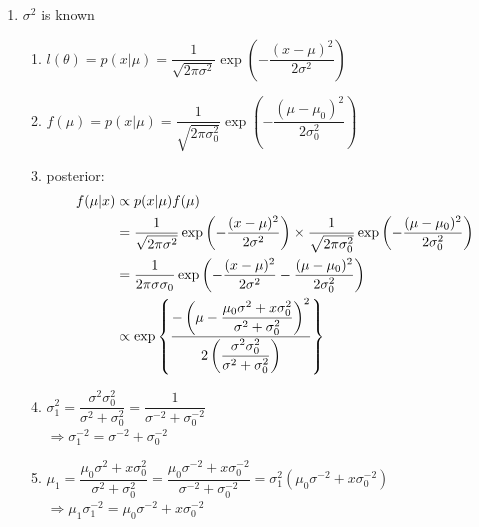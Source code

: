 \begin{enumerate}[itemsep=0.2cm]
    \item $\sigma^2$ is known
    \begin{enumerate}[itemsep=0.2cm]
        \item $
            l(\theta) 
            = p(x|\mu)
            =\dfrac{1}{\sqrt{2\pi \sigma^2}}
            \exp\left(
                -\dfrac{(x-\mu)^2}{2\sigma^2}
            \right)
        $

        \item $
            f(\mu) 
            = p(x|\mu)
            =\dfrac{1}{\sqrt{2\pi \sigma^2_0}}
            \exp\left(
                -\dfrac{(\mu-\mu_0)^2}{2\sigma_0^2}
            \right)
        $

        \item posterior:
        \begin{align*}
            f(\mu|x)
            &\propto p(x|\mu)f(\mu) \\
            &=\dfrac{1}{\sqrt{2\pi \sigma^2}}
            \exp\left(
                -\dfrac{(x-\mu)^2}{2\sigma^2}
            \right) 
            \times 
            \dfrac{1}{\sqrt{2\pi \sigma^2_0}}
            \exp\left(
                -\dfrac{(\mu-\mu_0)^2}{2\sigma_0^2}
            \right) \\
            &=\dfrac{1}{2\pi \sigma\sigma_0}
            \exp\left(
                -\dfrac{(x-\mu)^2}{2\sigma^2}
                -\dfrac{(\mu-\mu_0)^2}{2\sigma_0^2}
            \right) \\
            &\propto
            \exp\left\{
                \dfrac{
                    -\left(\mu - \dfrac{\mu_0\sigma^2 + x\sigma_0^2}{\sigma^2 + \sigma^2_0}\right)^2
                }{
                    2\left( \dfrac{\sigma^2\sigma^2_0}{\sigma^2+\sigma^2_0} \right)
                }
            \right\}
        \end{align*}

        \item $
            \sigma_1^2
            = \dfrac{\sigma^2\sigma^2_0}{\sigma^2+\sigma^2_0}
            = \dfrac{1}{\sigma^{-2}+\sigma^{-2}_0}
        $ \\[2ex]
        $
            \Rightarrow
            \sigma_1^{-2} = \sigma^{-2}+\sigma^{-2}_0
        $

        \item $
            \mu_1
            =  \dfrac{\mu_0\sigma^2 + x\sigma_0^2}{\sigma^2 + \sigma^2_0}
            =  \dfrac{\mu_0\sigma^{-2} + x\sigma_0^{-2}}{\sigma^{-2} + \sigma^{-2}_0}
            = \sigma_1^2(\mu_0\sigma^{-2} + x\sigma_0^{-2})
        $ \\[2ex]
        $
            \Rightarrow
            \mu_1\sigma_1^{-2} = \mu_0\sigma^{-2} + x\sigma_0^{-2}
        $


\end{enumerate}
\end{enumerate}
